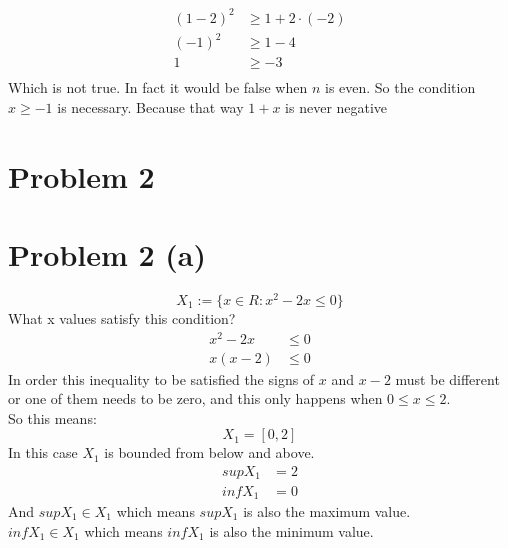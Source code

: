 \documentclass{article}
\begin{document}
\begin{align*}
   (1 - 2)^2 &\geq 1 + 2 \cdot (-2) \\
   (-1)^2    &\geq 1 - 4            \\
   1         &\geq -3               \\
\end{align*}
Which is not true. In fact it would be false when \(n\) is even. So the condition \(x \geq -1\) is necessary. Because that way \(1 + x\) is never negative

\section*{Problem 2}
\section*{Problem 2 (a)}
\[
   X_1 := \{x \in R: x^2 - 2x \leq 0\}
\]
What x values satisfy this condition? \\
\begin{align*}
   x^2 - 2x &\leq 0 \\
   x(x - 2) &\leq 0
\end{align*}
In order this inequality to be satisfied the signs of \(x\) and \(x - 2\) must be different or one of them needs to be zero, 
and this only happens when \(0 \leq x \leq 2\). \\
So this means:
\[
   X_1 = [0, 2]
\]
In this case \(X_1\) is bounded from below and above.\\
\begin{align*}
   sup X_1 &= 2 \\
   inf X_1 &= 0
\end{align*}
And \(sup X_1 \in X_1\) which means \(sup X_1\) is also the maximum value.\\
\(inf X_1 \in X_1\) which means \(inf X_1\) is also the minimum value.\\
\\
\end{document}

